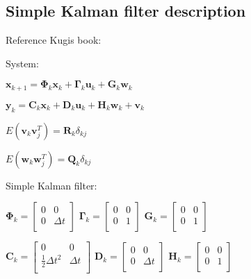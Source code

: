 \documentclass[class=article, crop=false]{standalone}
\begin{document}
\subsection{Simple Kalman filter description}\label{subsec:simple-kalman}

Reference Kugis book:

System:

$ \textbf{x}_{k+1} = \boldsymbol{\Phi}_k \textbf{x}_k + \boldsymbol{\Gamma}_k \textbf{u}_k + \textbf{G}_k \textbf{w}_k $

$ \textbf{y}_k =  \textbf{C}_k \textbf{x}_k + \textbf{D}_k \textbf{u}_k + \textbf{H}_k \textbf{w}_k + \textbf{v}_k $

$ E(\textbf{v}_k \textbf{v}^T_j) = \textbf{R}_k \delta_{kj} $

$ E(\textbf{w}_k \textbf{w}^T_j) = \textbf{Q}_k \delta_{kj} $

Simple Kalman filter:

    $\boldsymbol{\Phi}_k =
    \begin{bmatrix}
        0 & 0 \\
        0 & \Delta t \\
    \end{bmatrix} $
    \hspace{1.15cm}
    $\boldsymbol{\Gamma}_k  =
    \begin{bmatrix}
        0 & 0 \\
        0 & 1 \\
    \end{bmatrix} $
    \hspace{.78cm}
    $ \boldsymbol{G}_k  =
    \begin{bmatrix}
        0 & 0 \\
        0 & 1 \\
    \end{bmatrix} $

    $ \textbf{C}_k =
    \begin{bmatrix}
        0 & 0 \\
        \frac{1}{2} \Delta t^2 & \Delta t \\
    \end{bmatrix} $
    \hspace{.5cm}
    $ \textbf{D}_k =
    \begin{bmatrix}
        0 & 0 \\
        0 & \Delta t \\
    \end{bmatrix} $
    \hspace{.5cm}
    $ \textbf{H}_k =
    \begin{bmatrix}
        0 & 0 \\
        0 & 1 \\
    \end{bmatrix} $
\end{document}
